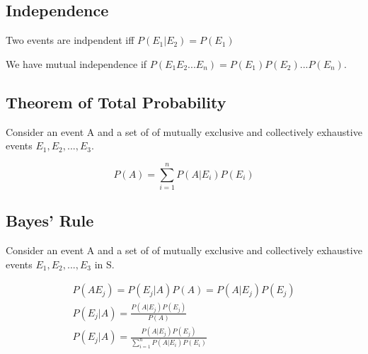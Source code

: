 \vspace{.5cm}

\subsection*{Independence}
Two events are indpendent iff $P(E_1|E_2) = P(E_1)$

We have mutual independence if $P(E_1E_2...E_n) = P(E_1)P(E_2)...P(E_n)$.

\vspace{.5cm}

\subsection*{Theorem of Total Probability}
Consider an event A and a set of of mutually exclusive and collectively exhaustive events $E_1, E_2, ..., E_3$.

\begin{equation}
    P(A) = \sum_{i=1}^nP(A|E_i)P(E_i)
\end{equation}

\vspace{.5cm}

\vspace{.5cm}

\subsection*{Bayes' Rule}
Consider an event A and a set of of mutually exclusive and collectively exhaustive events $E_1, E_2, ..., E_3$ in S.

\begin{align*}
    P(AE_j) = P(E_j|A)P(A) = P(A|E_j)P(E_j) \\
    P(E_j|A) = \frac{P(A|E_j)P(E_j)}{P(A)}\\
    P(E_j|A) = \frac{P(A|E_j)P(E_j)}{\sum_{i=1}^nP(A|E_i)P(E_i)}
\end{align*}